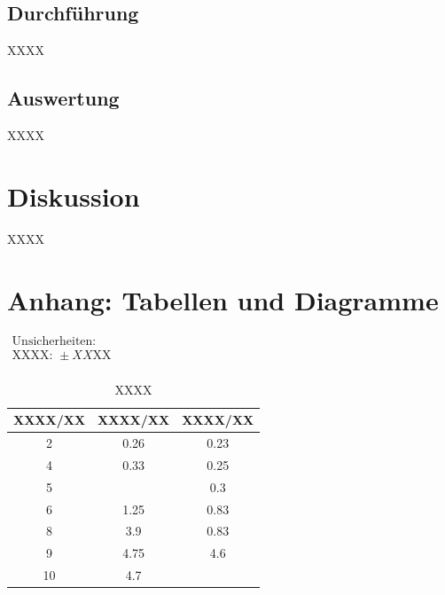\documentclass[11pt,a4paper]{article}
\begin{document}
\subsection{Durchführung}

XXXX

\subsection{Auswertung}

XXXX

\section{Diskussion}

XXXX

\pagebreak

\section{Anhang: Tabellen und Diagramme}

\begin{table}[h]
\centering
\caption{XXXX} \vspace{11pt}
$\begin{array}{l}
\textrm{Unsicherheiten:}\\
\textrm{XXXX: } \pm XX \textrm{XX}\\
\end{array}$
\begin{tabular}{ccc}
\toprule
\textrm{XXXX}/\textrm{XX} & \textrm{XXXX}/\textrm{XX} & \textrm{XXXX}/\textrm{XX} \\
\midrule 
2 & 0.26 & 0.23\\
\hline
4 & 0.33 & 0.25\\
\hline 
5 & & 0.3\\
\hline 
6 & 1.25 & 0.83\\
\hline 
8 & 3.9 & 0.83\\ 
\hline
9 & 4.75 & 4.6\\ 
\hline
10 & 4.7 &\\ 
\bottomrule
\end{tabular}
\label{Tab:X}
\end{table}

\end{document}
